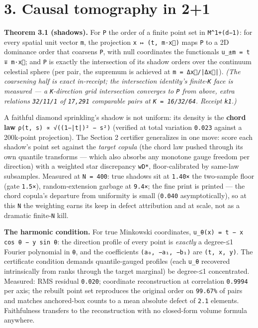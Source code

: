 \documentclass[11pt]{article}
\begin{document}
\section*{3. Causal tomography in 2+1}
\textbf{Theorem 3.1 (shadows).} For \texttt{P} the order of a finite point set in \texttt{M\textasciicircum{}{1+(d−1)}}: for every spatial unit vector \texttt{m}, the projection \texttt{x ↦ (t, m·x⃗)} maps \texttt{P} to a 2D dominance order that coarsens \texttt{P}, with null coordinates the functionals \texttt{u\_{±m} = t ∓ m·x⃗}; and \texttt{P} is exactly the intersection of its shadow orders over the continuum celestial sphere (per pair, the supremum is achieved at \texttt{m = Δx⃗/|Δx⃗|}). \emph{(The coarsening half is exact in-receipt; the intersection identity's finite-\texttt{K} face is measured — a \texttt{K}-direction grid intersection converges to \texttt{P} from above, extra relations \texttt{32/11/1} of \texttt{17,291} comparable pairs at \texttt{K = 16/32/64}. Receipt \texttt{k1}.)}

A faithful diamond sprinkling's shadow is not uniform: its density is the \textbf{chord law} \texttt{ρ(t, s) ∝ √((1−|t|)² − s²)} (verified at total variation \texttt{0.023} against a 200k-point projection). The Section 2 certifier generalizes in one move: score each shadow's point set against the \emph{target copula} (the chord law pushed through its own quantile transforms — which also absorbs any monotone gauge freedom per direction) with a weighted star discrepancy \texttt{wD*}, floor-calibrated by same-law subsamples. Measured at \texttt{N = 400}: true shadows sit at \texttt{1.40×} the two-sample floor (gate \texttt{1.5×}), random-extension garbage at \texttt{9.4×}; the fine print is printed — the chord copula's departure from uniformity is small (\texttt{0.040} asymptotically), so at this \texttt{N} the weighting earns its keep in defect attribution and at scale, not as a dramatic finite-\texttt{N} kill.

\textbf{The harmonic condition.} For true Minkowski coordinates, \texttt{u\_θ(x) = t − x cos θ − y sin θ}: the direction profile of every point is \emph{exactly} a degree-≤1 Fourier polynomial in \texttt{θ}, and the coefficients \texttt{(a₀, −a₁, −b₁)} are \texttt{(t, x, y)}. The certificate condition demands quantile-gauged profiles (each \texttt{u\_θ} recovered intrinsically from ranks through the target marginal) be degree-≤1 concentrated. Measured: RMS residual \texttt{0.020}; coordinate reconstruction at correlation \texttt{0.9994} per axis; the rebuilt point set reproduces the original order on \texttt{99.67\%} of pairs and matches anchored-box counts to a mean absolute defect of \texttt{2.1} elements. Faithfulness transfers to the reconstruction with no closed-form volume formula anywhere.
\end{document}

